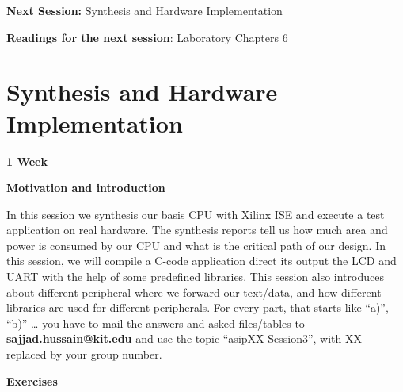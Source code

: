 \documentclass[
]{article}
\begin{document}
\textbf{Next Session:} Synthesis and Hardware Implementation

\textbf{Readings for the next session}: Laboratory Chapters 6

\hypertarget{synthesis-and-hardware-implementation}{%
\section{\texorpdfstring{\textbf{Synthesis and} Hardware
\textbf{Implementation}
}{Synthesis and Hardware Implementation }}\label{synthesis-and-hardware-implementation}}

\textbf{{1 Week}}

\textbf{Motivation and introduction}

In this session we synthesis our basis CPU with Xilinx ISE and execute a
test application on real hardware. The synthesis reports tell us how
much area and power is consumed by our CPU and what is the critical path
of our design. In this session, we will compile a C-code application
direct its output the LCD and UART with the help of some predefined
libraries. This session also introduces about different peripheral where
we forward our text/data, and how different libraries are used for
different peripherals. For every part, that starts like ``a)'', ``b)''
\ldots{} you have to mail the answers and asked files/tables to
\textbf{sajjad.hussain@kit.edu} and use the topic ``asipXX-Session3'',
with XX replaced by your group number.

\textbf{Exercises}
\end{document}
